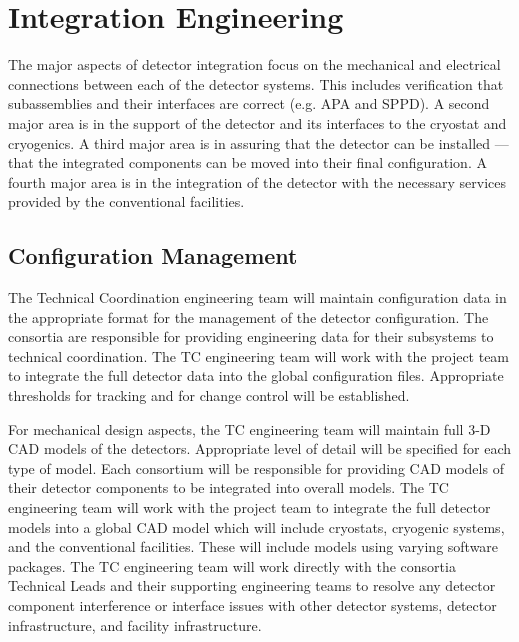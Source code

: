 \section{Integration Engineering}
\label{sec:fdsp-coord-integ-sysengr}

The major aspects of detector integration focus on the mechanical and
electrical connections between each of the detector systems. This
includes verification that subassemblies and their interfaces are
correct (e.g. APA and SPPD). A second major area is in the support of
the detector and its interfaces to the cryostat and cryogenics. A
third major area is in assuring that the detector can be installed ---
that the integrated components can be moved into their final
configuration. A fourth major area is in the integration of the
detector with the necessary services provided by the conventional
facilities.

\subsection{Configuration Management}
\label{sec:fdsp-coord-integ-config}

The  Technical Coordination engineering team will maintain
configuration data in the appropriate format for the management of the
detector configuration. The consortia are responsible for providing
engineering data for their subsystems to technical coordination. The
TC engineering team will work with the  project team to
integrate the full detector data into the global 
configuration files. Appropriate thresholds for tracking and for
change control will be established.

For mechanical design aspects, the  TC engineering team
will maintain full 3-D CAD models of the detectors. Appropriate level
of detail will be specified for each type of model. Each consortium
will be responsible for providing CAD models of their detector
components to be integrated into overall models. The TC engineering
team will work with the  project team to integrate the
full detector models into a global  CAD model which will
include cryostats, cryogenic systems, and the conventional
facilities. These will include models using varying software
packages. The TC engineering team will work directly with the
consortia Technical Leads and their supporting engineering teams to
resolve any detector component interference or interface issues with
other detector systems, detector infrastructure, and facility
infrastructure.

